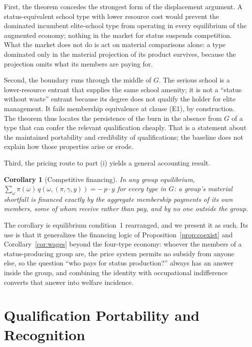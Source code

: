 \documentclass[12pt,letterpaper]{article}
\newtheorem{corollary}{Corollary}
\theoremstyle{definition}
\begin{document}
First, the theorem concedes the strongest form of the displacement argument.
A status-equivalent school type with lower resource cost would prevent the dominated incumbent elite-school type from operating in every equilibrium of the augmented economy; nothing in the market for status suspends competition.
What the market does not do is act on material comparisons alone: a type dominated only in the material projection of its product survives, because the projection omits what its members are paying for.

Second, the boundary runs through the middle of $G$.
The serious school is a lower-resource entrant that supplies the same school amenity; it is not a ``status without waste'' entrant because its degree does not qualify the holder for elite management.
It fails membership equivalence at clause (E1), by construction.
The theorem thus locates the persistence of the burn in the absence from $G$ of a type that can confer the relevant qualification cheaply.
That is a statement about the maintained portability and credibility of qualifications; the baseline does not explain how those properties arise or erode.

Third, the pricing route to part (i) yields a general accounting result.

\begin{corollary}[Competitive financing]\label{cor:financing}
In any group equilibrium, $\sum_{\omega}\pi(\omega)\,q(\omega,(\pi,\gamma,y)) = -\,p\cdot y$ for every type in $G$: a group's material shortfall is financed exactly by the aggregate membership payments of its own members, some of whom receive rather than pay, and by no one outside the group.
\end{corollary}

The corollary is equilibrium condition~1 rearranged, and we present it as such.
Its use is that it generalizes the financing logic of Proposition~\ref{prop:coexist} and Corollary~\ref{cor:wages} beyond the four-type economy: whoever the members of a status-producing group are, the price system permits no subsidy from anyone else, so the question ``who pays for status production?'' always has an answer inside the group, and combining the identity with occupational indifference converts that answer into welfare incidence.

\section{Qualification Portability and Recognition}\label{sec:portability}
\end{document}
